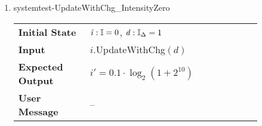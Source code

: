\begin{enumerate}
    \item{systemtest-UpdateWithChg\_IntensityZero}
    \begin{table}[H]
        \centering
        \begin{tabular}{P{0.25\linewidth}P{0.6\linewidth}}
            \toprule
            \textbf{Initial State} & $ \mathit{i} : \mathbb{I} =
            0 $, $ \mathit{d} : \mathbb{I}_{\Delta} = 1 $ \\
            \textbf{Input} & $\mathit{i}.
            $UpdateWithChg$(\mathit{d}) $ \\ \midrule
            \textbf{Expected Output} & $ \mathit{i}' = 0.1 \cdot
            \log_2(1 + 2^{10}) $ \\
            \textbf{User Message} & -- \\ \bottomrule
        \end{tabular}
    \end{table}

\end{enumerate}

